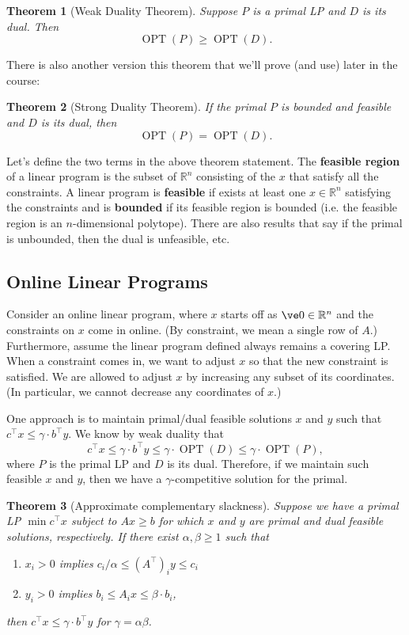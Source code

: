 \documentclass[11pt]{article}
\def\on{\operatorname}
\def\RR{\mathbb R}
\newtheorem{theorem}{Theorem}
\begin{document}
\begin{theorem}[Weak Duality Theorem]
  Suppose $P$ is a primal LP and $D$ is its dual. Then
  \[ \on{OPT}(P)\ge\on{OPT}(D). \]
\end{theorem}

There is also another version this theorem that we'll prove (and use) later in the course:

\begin{theorem}[Strong Duality Theorem]
  If the primal $P$ is bounded and feasible and $D$ is its dual, then
  \[ \on{OPT}(P) = \on{OPT}(D). \]
\end{theorem}

Let's define the two terms in the above theorem statement. The \textbf{feasible region} of a linear program is the subset of $\RR^n$ consisting of the $x$ that satisfy all the constraints. A linear program is \textbf{feasible} if exists at least one $x\in\RR^n$ satisfying the constraints and is \textbf{bounded} if its feasible region is bounded (i.e. the feasible region is an $n$-dimensional polytope). There are also results that say if the primal is unbounded, then the dual is unfeasible, etc.

\subsection{Online Linear Programs}

Consider an online linear program, where $x$ starts off as $\ve 0\in\RR^n$ and the constraints on $x$ come in online. (By constraint, we mean a single row of $A$.) Furthermore, assume the linear program defined always remains a covering LP. When a constraint comes in, we want to adjust $x$ so that the new constraint is satisfied. We are allowed to adjust $x$ by increasing any subset of its coordinates. (In particular, we cannot decrease any coordinates of $x$.)

One approach is to maintain primal/dual feasible solutions $x$ and $y$ such that $c^\top x\le \gamma\cdot b^\top y$. We know by weak duality that 
\[ c^\top x\le \gamma\cdot b^\top y\le \gamma\cdot\on{OPT}(D)\le \gamma\cdot\on{OPT}(P), \]
where $P$ is the primal LP and $D$ is its dual. Therefore, if we maintain such feasible $x$ and $y$, then we have a $\gamma$-competitive solution for the primal.

\begin{theorem}[Approximate complementary slackness]
  Suppose we have a primal LP $\min c^\top x$ subject to $Ax\ge b$ for which $x$ and $y$ are primal and dual feasible solutions, respectively. If there exist $\alpha,\beta\ge 1$ such that
  \begin{enumerate}
    \item $x_i > 0$ implies $c_i/\alpha\le (A^\top)_i y\le c_i$
    \item $y_i > 0$ implies $b_i\le A_i x\le \beta\cdot b_i$,
  \end{enumerate}
  then $c^\top x\le \gamma\cdot b^\top y$ for $\gamma = \alpha\beta$.
\end{theorem}
\end{document}
